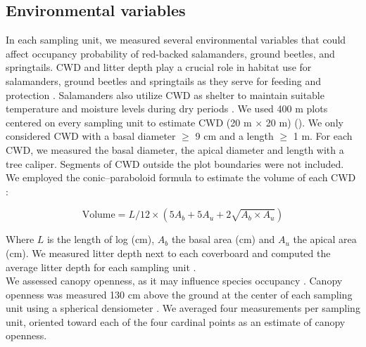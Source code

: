 \vspace{0.5cm}


\subsection*{Environmental variables}
\label{subsec:EnvVar}

In each sampling unit, we measured several environmental variables that could affect occupancy probability of red-backed salamanders, ground beetles, and springtails.
CWD and litter depth play a crucial role in habitat use for salamanders, ground beetles and springtails as
they serve for feeding and protection  \citep{harmonEcologyCoarseWoody1986,koivula.LeafLitterSmallscale1999,birdChangesSoilLitter2004,mckennyEffectsStructuralComplexity2006}. 
Salamanders also utilize CWD as shelter to maintain suitable temperature and moisture levels during dry periods \citep{Jaeger1980MicrohabitatsTerrestrial,groverInfluenceCoverMoisture1998a,patrickEffectsExperimentalForestry2006a}.
We used 400 m plots centered on every sampling unit to estimate CWD (20 m $\times$  20 m) (\citealp{methotGuideInventaireEchantillonnage2014}). 
We only considered CWD with a basal diameter $\geq$ 9 cm and a length $\geq$ 1 m.
For each CWD, we measured the basal diameter, the apical diameter and length with a tree caliper.
Segments of CWD outside the plot boundaries were not included.
We employed the conic–paraboloid formula to estimate the volume of each CWD \citep{fraverRefiningVolumeEstimates2007} :

\begin{equation}
  \text{Volume} = L/12 \times (5A_b + 5A_u + 2\sqrt{A_b \times A_u})
\end{equation}

\vspace{0.5cm}

Where $L$ is the length of log (cm), $A_b$ the basal area (cm) and $A_u$ the apical area (cm).
We measured litter depth next to each coverboard and computed the average litter depth for each sampling unit \citep{Mazerolle2021Woodlandsalamander}. \\

We assessed canopy openness, as it may influence species occupancy \citep{messereForestFloorDistribution1998,koivulaBorealCarabidbeetleColeoptera2002a,tilghmanMetaanalysisEffectsCanopy2012,henneronForestPlantCommunity2017}.
Canopy openness was measured 130 cm above the ground at the center of each sampling unit using a spherical densiometer \citep{lemmonSphericalDensiometerEstimating1956}. 
We averaged four measurements per sampling unit, oriented toward each of the four cardinal points as an estimate of canopy openness.

